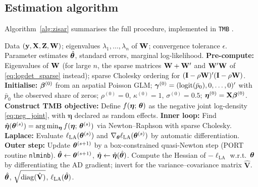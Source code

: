 \subsection{Estimation algorithm}\label{sec:est_algorithm}

Algorithm~\ref{alg:zisar} summarises the full procedure, implemented in \texttt{TMB} \citep{kristensen2016}.

\begin{algorithm}[htbp]
\caption{Marginal-likelihood estimation of the ZISAR model via Laplace approximation.}\label{alg:zisar}
\begin{algorithmic}[1]
\Require Data $(\mathbf{y}, \mathbf{X}, \mathbf{Z}, \mathbf{W})$; eigenvalues $\lambda_1,\ldots,\lambda_n$ of $\mathbf{W}$; convergence tolerance $\epsilon$.
\Ensure Parameter estimates $\hat{\boldsymbol{\theta}}$, standard errors, marginal log-likelihood.
\State \textbf{Pre-compute:} Eigenvalues of $\mathbf{W}$ (for large $n$, the sparse matrices $\mathbf{W}+\mathbf{W}'$ and $\mathbf{W}'\mathbf{W}$ of \eqref{eq:logdet_sparse} instead); sparse Cholesky ordering for $(\mathbf{I}-\rho\mathbf{W})'(\mathbf{I}-\rho\mathbf{W})$.
\State \textbf{Initialise:} $\boldsymbol{\beta}^{(0)}$ from an aspatial Poisson GLM; $\boldsymbol{\gamma}^{(0)} = (\operatorname{logit}(\bar{p}_0), 0, \ldots, 0)'$ with $\bar{p}_0$ the observed share of zeros; $\rho^{(0)}=0$, $\kappa^{(0)}=1$, $\sigma^{(0)}=0.5$; $\boldsymbol{\eta}^{(0)} = \mathbf{X}\boldsymbol{\beta}^{(0)}$.
\State \textbf{Construct TMB objective:} Define $f(\boldsymbol{\eta};\,\boldsymbol{\theta})$ as the negative joint log-density \eqref{eq:neg_joint}, with $\boldsymbol{\eta}$ declared as random effects.
\Repeat
  \State \textbf{Inner loop:} Find $\hat{\boldsymbol{\eta}}(\boldsymbol{\theta}^{(s)}) = \arg\min_{\boldsymbol{\eta}} f(\boldsymbol{\eta};\,\boldsymbol{\theta}^{(s)})$ via Newton--Raphson with sparse Cholesky.
  \State \textbf{Laplace:} Evaluate $\ell_{\mathrm{LA}}(\boldsymbol{\theta}^{(s)})$ and $\nabla_{\boldsymbol{\theta}}\ell_{\mathrm{LA}}(\boldsymbol{\theta}^{(s)})$ by automatic differentiation.
  \State \textbf{Outer step:} Update $\boldsymbol{\theta}^{(s+1)}$ by a box-constrained quasi-Newton step (PORT routine \texttt{nlminb}).
\State $\hat{\boldsymbol{\theta}} \leftarrow \boldsymbol{\theta}^{(s+1)}$, $\hat{\boldsymbol{\eta}} \leftarrow \hat{\boldsymbol{\eta}}(\hat{\boldsymbol{\theta}})$.
\State Compute the Hessian of $-\ell_{\mathrm{LA}}$ w.r.t.\ $\boldsymbol{\theta}$ by differentiating the AD gradient; invert for the variance--covariance matrix $\hat{\mathbf{V}}$.
\State \Return $\hat{\boldsymbol{\theta}}$, $\sqrt{\operatorname{diag}(\hat{\mathbf{V}})}$, $\ell_{\mathrm{LA}}(\hat{\boldsymbol{\theta}})$.
\end{algorithmic}
\end{algorithm}

